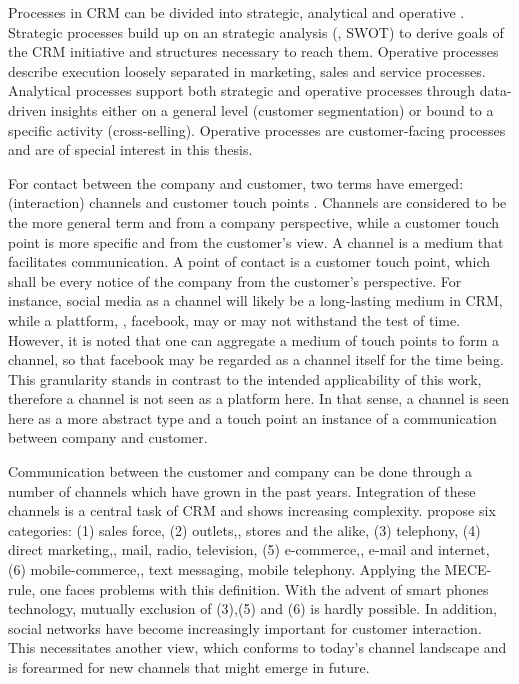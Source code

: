 		Processes in CRM can be divided into strategic, analytical and operative \cite{Neckel2005}. Strategic processes build up on an strategic analysis (\ie, SWOT) to derive goals of the CRM initiative and structures necessary to reach them. Operative processes describe execution loosely separated in marketing, sales and service processes. Analytical processes support both strategic and operative processes through data-driven insights either on a general level (\ie customer segmentation) or bound to a specific activity (\ie cross-selling). Operative processes are customer-facing processes and are of special interest in this thesis. 
		
		 For contact between the company and customer, two terms have emerged: (interaction) channels and customer touch points \cite{Leuer2011}. Channels are considered to be the more general term and from a company perspective, while a customer touch point is more specific and from the customer's view.  A channel is a medium that facilitates communication. A point of contact is a customer touch point, which shall be every notice of the company from the customer's perspective. For instance, social media as a channel will likely be a long-lasting medium in CRM, while a plattform, \ie, facebook, may or may not withstand the test of time. However, it is noted that one can aggregate a medium of touch points to form a channel, so that facebook may be regarded as a channel itself for the time being. This granularity stands in contrast to the intended applicability of this work, therefore a channel is  not seen as a platform here. 
		 In that sense, a channel is seen here as a more abstract type and a touch point an instance of a communication between company and customer. 
		
		Communication between the customer and company can be done through a number of channels which have grown in the past years. Integration of these channels is a central task of CRM and shows increasing complexity. \cite{paynefrow2005} propose six categories: (1) sales force, (2) outlets,\ie, stores and the alike, (3) telephony, (4) direct marketing,\ie, mail, radio, television, (5) e-commerce,\ie, e-mail and internet, (6) mobile-commerce,\ie, text messaging, mobile telephony. Applying the \acrfull{MECE}-rule, one faces problems with this definition. With the advent of smart phones technology, mutually exclusion of (3),(5) and (6) is hardly possible. In addition, social networks have become increasingly important for customer interaction. This necessitates another view, which conforms to today's channel landscape and is forearmed for new channels that might emerge in future. 
		
